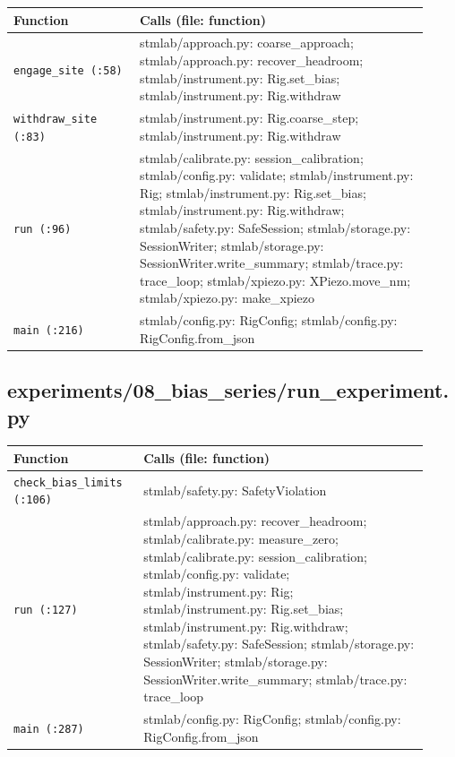 \small\setlength{\LTleft}{0pt}\setlength{\LTright}{\fill}
\begin{longtable}{@{}>{\raggedright\arraybackslash}p{0.280\linewidth}>{\raggedright\arraybackslash}p{0.640\linewidth}@{}}
\toprule
\textbf{Function} & \textbf{Calls (file: function)} \\
\midrule\endhead
\texttt{engage\_\discretionary{}{}{}site (:58)} & stmlab/approach.py: coarse\_approach; stmlab/approach.py: recover\_headroom; stmlab/instrument.py: Rig.set\_bias; stmlab/instrument.py: Rig.withdraw \\
\texttt{withdraw\_\discretionary{}{}{}site (:83)} & stmlab/instrument.py: Rig.coarse\_step; stmlab/instrument.py: Rig.withdraw \\
\texttt{run (:96)} & stmlab/calibrate.py: session\_calibration; stmlab/config.py: validate; stmlab/instrument.py: Rig; stmlab/instrument.py: Rig.set\_bias; stmlab/instrument.py: Rig.withdraw; stmlab/safety.py: SafeSession; stmlab/storage.py: SessionWriter; stmlab/storage.py: SessionWriter.write\_summary; stmlab/trace.py: trace\_loop; stmlab/xpiezo.py: XPiezo.move\_nm; stmlab/xpiezo.py: make\_xpiezo \\
\texttt{main (:216)} & stmlab/config.py: RigConfig; stmlab/config.py: RigConfig.from\_json \\
\bottomrule
\end{longtable}
\normalsize

\subsection{experiments/08\_bias\_series/run\_experiment.py}

\small\setlength{\LTleft}{0pt}\setlength{\LTright}{\fill}
\begin{longtable}{@{}>{\raggedright\arraybackslash}p{0.280\linewidth}>{\raggedright\arraybackslash}p{0.640\linewidth}@{}}
\toprule
\textbf{Function} & \textbf{Calls (file: function)} \\
\midrule\endhead
\texttt{check\_\discretionary{}{}{}bias\_\discretionary{}{}{}limits (:106)} & stmlab/safety.py: SafetyViolation \\
\texttt{run (:127)} & stmlab/approach.py: recover\_headroom; stmlab/calibrate.py: measure\_zero; stmlab/calibrate.py: session\_calibration; stmlab/config.py: validate; stmlab/instrument.py: Rig; stmlab/instrument.py: Rig.set\_bias; stmlab/instrument.py: Rig.withdraw; stmlab/safety.py: SafeSession; stmlab/storage.py: SessionWriter; stmlab/storage.py: SessionWriter.write\_summary; stmlab/trace.py: trace\_loop \\
\texttt{main (:287)} & stmlab/config.py: RigConfig; stmlab/config.py: RigConfig.from\_json \\
\bottomrule
\end{longtable}
\normalsize

